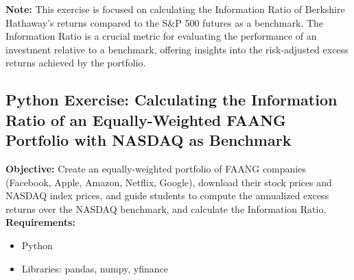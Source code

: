 \documentclass{article}
\begin{document}
\textbf{Note:} This exercise is focused on calculating the Information Ratio of Berkshire Hathaway's returns compared to the S\&P 500 futures as a benchmark. The Information Ratio is a crucial metric for evaluating the performance of an investment relative to a benchmark, offering insights into the risk-adjusted excess returns achieved by the portfolio.

\subsection{Python Exercise: Calculating the Information Ratio of an Equally-Weighted FAANG Portfolio with NASDAQ as Benchmark}

\textbf{Objective:} Create an equally-weighted portfolio of FAANG companies (Facebook, Apple, Amazon, Netflix, Google), download their stock prices and NASDAQ index prices, and guide students to compute the annualized excess returns over the NASDAQ benchmark, and calculate the Information Ratio. \\

\textbf{Requirements:}
\begin{itemize}
    \item Python
    \item Libraries: pandas, numpy, yfinance
\end{itemize}
\end{document}

